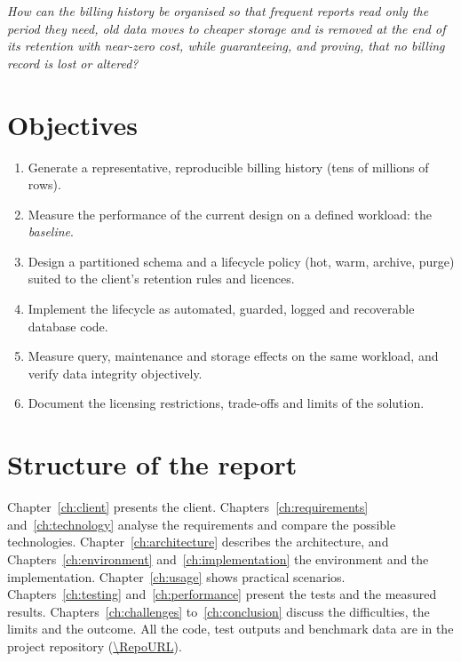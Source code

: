 \emph{How can the billing history be organised so that frequent reports read only the period
they need, old data moves to cheaper storage and is removed at the end of its retention with
near-zero cost, while guaranteeing, and proving, that no billing record is lost or altered?}

\section{Objectives}

\begin{enumerate}
  \item Generate a representative, reproducible billing history (tens of millions of rows).
  \item Measure the performance of the current design on a defined workload: the
        \emph{baseline}.
  \item Design a partitioned schema and a lifecycle policy (hot, warm, archive, purge) suited
        to the client's retention rules and licences.
  \item Implement the lifecycle as automated, guarded, logged and recoverable database code.
  \item Measure query, maintenance and storage effects on the same workload, and verify data
        integrity objectively.
  \item Document the licensing restrictions, trade-offs and limits of the solution.
\end{enumerate}

\section{Structure of the report}

Chapter~\ref{ch:client} presents the client. Chapters~\ref{ch:requirements}
and~\ref{ch:technology} analyse the requirements and compare the possible technologies.
Chapter~\ref{ch:architecture} describes the architecture, and
Chapters~\ref{ch:environment} and~\ref{ch:implementation} the environment and the
implementation. Chapter~\ref{ch:usage} shows practical scenarios. Chapters~\ref{ch:testing}
and~\ref{ch:performance} present the tests and the measured results.
Chapters~\ref{ch:challenges} to~\ref{ch:conclusion} discuss the difficulties, the limits and
the outcome. All the code, test outputs and benchmark data are in the project repository
(\url{\RepoURL}).
